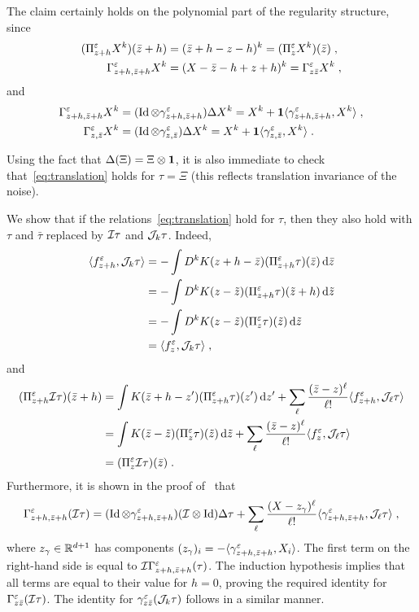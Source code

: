 \documentclass[reqno,11pt]{article}
\def\unit{\vone}
\DeclareMathOperator{\Id}{Id}
\begin{document}
\begin{enum}
\item 	The claim certainly holds on the polynomial part of
the regularity structure, since 
\begin{align*}
(\Pi^\varepsilon_{z+h}X^k)(\bar z+h) &= (\bar z+h-z-h)^k = (\Pi^\varepsilon_z X^k)(\bar z)\;,
\\
\Gamma^\varepsilon_{z+h,\bar z+h}X^k &= (X-\bar z-h+z+h)^k = \Gamma^\varepsilon_{z\bar
z}X^k\;, 
\end{align*}
and 
\begin{align*}
 \Gamma^\eps_{z+h,\bar z+h}X^k &= (\Id\otimes\gamma^\eps_{z+h,\bar z+h})\Delta
X^k
 = X^k + \unit\pscal{\gamma^\eps_{z+h,\bar z+h}}{X^k}\;, \\
 \Gamma^\eps_{z,\bar z}X^k &= (\Id\otimes\gamma^\eps_{z,\bar z})\Delta X^k
 = X^k + \unit\pscal{\gamma^\eps_{z,\bar z}}{X^k}\;.
\end{align*}

\item 	Using the fact that $\Delta(\Xi)=\Xi\otimes\unit$, it is also immediate
to check that~\eqref{eq:translation} holds for $\tau=\Xi$ (this reflects
translation invariance of the noise).


\item	We show that if the relations~\eqref{eq:translation} hold for $\tau$,
then they also hold with $\tau$ and $\bar\tau$ replaced by ${\mathcal I}\tau$ and
${\mathcal J}_k\tau$. Indeed, 
\begin{align*}
\langle f^\varepsilon_{z+h},{\mathcal J}_k\tau\rangle 
&= -\int D^k K(z+h-\bar z) (\Pi^\varepsilon_{z+h}\tau)(\bar z)\operatorname{d}\!\bar z \\
&= -\int D^k K(z-\tilde z) (\Pi^\varepsilon_{z+h}\tau)(\tilde z+h)\operatorname{d}\!\tilde z \\
&= -\int D^k K(z-\tilde z) (\Pi^\varepsilon_z\tau)(\tilde z)\operatorname{d}\!\tilde z \\
&= \langle f^\varepsilon_z,{\mathcal J}_k\tau\rangle\;,
\end{align*}
and 
\begin{align*}
(\Pi^\varepsilon_{z+h}{\mathcal I}\tau)(\bar z+h) 
&= \int K(\bar z+h-z') (\Pi^\varepsilon_{z+h}\tau)(z')\operatorname{d}\!z' +
\sum_\ell \frac{(\bar z-z)^\ell}{\ell!}\langle f^\varepsilon_{z+h},{\mathcal J}_\ell\tau\rangle \\
&= \int K(\bar z-\tilde z) (\Pi^\varepsilon_z\tau)(\tilde z)\operatorname{d}\!\tilde z +
\sum_\ell \frac{(\bar z-z)^\ell}{\ell!}\langle f^\varepsilon_z,{\mathcal J}_\ell\tau\rangle \\
&= (\Pi^\varepsilon_z{\mathcal I}\tau)(\bar z)\;.
\end{align*}
Furthermore, it is shown in the proof of~\cite[Thm.~8.24]{Hairer2014} that  
\[
 \Gamma^\eps_{z+h,\bar z+h}(\cI\tau) = 
 (\Id\otimes\gamma^\eps_{z+h,\bar z+h})(\cI\otimes\Id)\Delta\tau
 + \sum_\ell \frac{(X-z_\gamma)^\ell}{\ell!} \pscal{\gamma^\eps_{z+h,\bar
z+h}}{\cJ_\ell\tau}\;,
\]
where $z_\gamma\in\mathbb{R}^{d+1}$ has components
$(z_\gamma)_i=-\langle\gamma^\varepsilon_{z+h,\bar z+h},X_i\rangle$. 
The first term on the right-hand side is equal to 
${\mathcal I} \Gamma^\varepsilon_{z+h,\bar z+h}(\tau)$. 
The induction hypothesis implies that all terms are equal to their value for
$h=0$, proving the required identity for $\Gamma^\varepsilon_{z\bar z}({\mathcal I}\tau)$. The
identity for $\gamma^\varepsilon_{z\bar z}({\mathcal J}_k\tau)$ follows in a similar manner. 


\end{enum}
\end{document}
